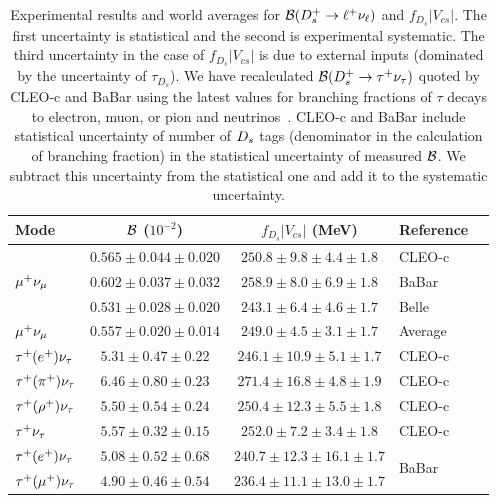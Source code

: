 \begin{table}[t!]
\caption{Experimental results and world averages for ${\cal{B}}(D_{s}^+\to\ell^+\nu_{\ell})$ and $f_{D_s}|V_{cs}|$.
The first uncertainty is statistical and the second is experimental systematic. The third uncertainty 
in the case of $f_{D_s}|V_{cs}|$ is due to external inputs (dominated by the uncertainty of $\tau_{D_s}$).
We have recalculated ${\cal B}(D_{s}^+\to\tau^+\nu_{\tau})$ quoted by CLEO-c and BaBar using the latest 
values for branching fractions of $\tau$ decays to electron, muon, or pion and neutrinos~\cite{PDG_2012}.
CLEO-c and BaBar include statistical uncertainty of number of $D_{s}$ tags (denominator in the calculation of 
branching fraction) in the statistical uncertainty of measured ${\cal B}$. We subtract this uncertainty from the
statistical one and add it to the systematic uncertainty. 
\label{tab:DsLeptonic}}
\begin{center}
\begin{tabular}{lccll}
\toprule
\rowcolor{Gray}
Mode 		& ${\cal{B}}$ ($10^{-2}$) 	& $f_{D_s}|V_{cs}|$ (MeV) 		& Reference & 
\\ \midrule
\multirow{3}{*}{$\mu^+\nu_{\mu}$}	& $0.565\pm0.044\pm 0.020$ 	& $250.8 \pm 9.8 \pm 4.4 \pm 1.8$	& CLEO-c &\cite{Alexander:2009ux}\\		
				& $0.602\pm0.037\pm 0.032$ 	& $258.9 \pm 8.0 \pm 6.9 \pm 1.8$	& BaBar  &\cite{delAmoSanchez:2010jg}\\
				& $0.531\pm0.028\pm 0.020$ 	& $243.1 \pm 6.4 \pm 4.6 \pm 1.7$ 	& Belle  &\cite{Zupanc:2013byn}\\
\midrule
\rowcolor{Gray}
$\mu^+\nu_{\mu}$ 			& $0.557\pm0.020\pm0.014$ 		& $249.0 \pm 4.5 \pm 3.1 \pm 1.7$ 	& Average & \\
\midrule
$\tau^+(e^+)\nu_{\tau}$ 			& $5.31\pm0.47\pm0.22$ 		& $246.1 \pm 10.9 \pm 5.1 \pm 1.7$ 	& CLEO-c &\cite{Onyisi:2009th}\\
$\tau^+(\pi^+)\nu_{\tau}$ 			& $6.46\pm0.80\pm0.23$ 		& $271.4 \pm 16.8 \pm 4.8 \pm 1.9$  & CLEO-c &\cite{Alexander:2009ux}\\
$\tau^+(\rho^+)\nu_{\tau}$ 			& $5.50\pm0.54\pm0.24$ 		& $250.4 \pm 12.3 \pm 5.5 \pm 1.8$  & CLEO-c &\cite{Naik:2009tk}\\
\midrule
\rowcolor{LightGray}
$\tau^+\nu_{\tau}$			& $5.57\pm0.32\pm0.15$		& $252.0 \pm 7.2 \pm 3.4 \pm 1.8$   & CLEO-c & \\
\midrule
$\tau^+(e^+)\nu_{\tau}$ 			& $5.08\pm0.52\pm0.68$ 		& $240.7 \pm 12.3 \pm 16.1 \pm 1.7$	& \multirow{2}{*}{BaBar} & \multirow{2}{*}{\cite{delAmoSanchez:2010jg}}\\
$\tau^+(\mu^+)\nu_{\tau}$ 			& $4.90\pm0.46\pm0.54$ 		& $236.4 \pm 11.1 \pm 13.0 \pm 1.7$	&  & \\

\end{tabular}
\end{center}
\end{table}
